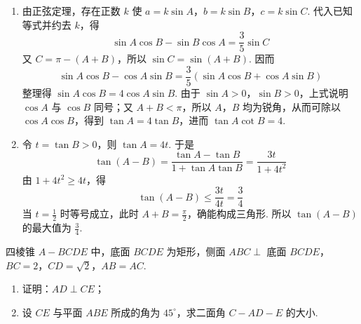 \begin{solution}
\begin{enumerate}
\item 由正弦定理，存在正数 \(k\) 使 \(a=k\sin A\)，\(b=k\sin B\)，\(c=k\sin C\). 代入已知等式并约去 \(k\)，得
\[
\sin A\cos B-\sin B\cos A=\frac{3}{5}\sin C
\]
又 \(C=\pi-(A+B)\)，所以 \(\sin C=\sin(A+B)\). 因而
\[
\sin A\cos B-\cos A\sin B=\frac{3}{5}\left(\sin A\cos B+\cos A\sin B\right)
\]
整理得 \(\sin A\cos B=4\cos A\sin B\). 由于 \(\sin A>0\)，\(\sin B>0\)，上式说明 \(\cos A\) 与 \(\cos B\) 同号；又 \(A+B<\pi\)，所以 \(A\)，\(B\) 均为锐角，从而可除以 \(\cos A\cos B\)，得到 \(\tan A=4\tan B\)，进而 \(\tan A\cot B=4\).
\item 令 \(t=\tan B>0\)，则 \(\tan A=4t\). 于是
\[
\tan(A-B)=\frac{\tan A-\tan B}{1+\tan A\tan B}=\frac{3t}{1+4t^2}
\]
由 \(1+4t^2\geqslant 4t\)，得
\[
\tan(A-B)\leqslant\frac{3t}{4t}=\frac{3}{4}
\]
当 \(t=\frac{1}{2}\) 时等号成立，此时 \(A+B=\frac{\pi}{2}\)，确能构成三角形. 所以 \(\tan(A-B)\) 的最大值为 \(\frac{3}{4}\).
\end{enumerate}
\end{solution}

\begin{problem}
四棱锥 \(A - BCDE\) 中，底面 \(BCDE\) 为矩形，侧面 \(ABC \perp\) 底面 \(BCDE\)，\(BC = 2\)，\(CD = \sqrt{2}\)，\(AB = AC\).

\begin{enumerate}
\item 证明：\(AD \perp CE\)；
\item 设 \(CE\) 与平面 \(ABE\) 所成的角为 \(45^{\circ}\)，求二面角 \(C - AD - E\) 的大小.
\end{enumerate}

\end{problem}

